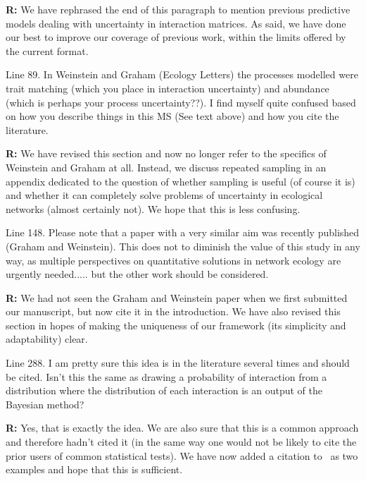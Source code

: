 \documentclass[12pt]{letter}
\newenvironment{refquote}{\bigskip \begin{it}}{\end{it}\smallskip}
\begin{document}
		\textbf{R:} We have rephrased the end of this paragraph to mention previous predictive models dealing with uncertainty in interaction matrices. As said, we have done our best to improve our coverage of previous work, within the limits offered by the current format.


		\begin{refquote}
		Line 89.  In Weinstein and Graham (Ecology Letters) the processes modelled were trait matching (which you place in interaction uncertainty) and abundance (which is perhaps your process uncertainty??).  I find myself quite confused based on how you describe things in this MS (See text above) and how you cite the literature.
		\end{refquote}


		\textbf{R:} We have revised this section and now no longer refer to the specifics of Weinstein and Graham at all. Instead, we discuss repeated sampling in an appendix dedicated to the question of whether sampling is useful (of course it is) and whether it can completely solve problems of uncertainty in ecological networks (almost certainly not). We hope that this is less confusing.


		\begin{refquote}
		Line 148.  Please note that a paper with a very similar aim was recently published (Graham and Weinstein).  This does not to diminish the value of this study in any way, as multiple perspectives on quantitative solutions in network ecology are urgently needed..... but the other work should be considered. 
		\end{refquote}


		\textbf{R:} We had not seen the Graham and Weinstein paper when we first submitted our manuscript, but now cite it in the introduction. We have also revised this section in hopes of making the uniqueness of our framework (its simplicity and adaptability) clear. %


		\begin{refquote}
		Line 288.  I am pretty sure this idea is in the literature several times and should be cited.  Isn't this the same as drawing a probability of interaction from a distribution where the distribution of each interaction is an output of the Bayesian method?
		\end{refquote}


		\textbf{R:} Yes, that is exactly the idea. We are also sure that this is a common approach and therefore hadn't cited it (in the same way one would not be likely to cite the prior users of common statistical tests). We have now added a citation to~\citet{Vazquez2005,Guimera2009} as two examples and hope that this is sufficient.
\end{document}
